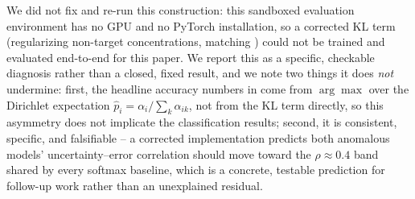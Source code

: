 We did not fix and re-run this construction: this sandboxed evaluation environment has no GPU and
no PyTorch installation, so a corrected KL term (regularizing non-target concentrations, matching
\citet{sensoy2018evidential}) could not be trained and evaluated end-to-end for this paper. We
report this as a specific, checkable diagnosis rather than a closed, fixed result, and we note two
things it does \emph{not} undermine: first, the headline accuracy numbers in
 come from $\arg\max$ over the Dirichlet expectation $\hat p_i=\alpha_i/\sum_k
\alpha_{ik}$, not from the KL term directly, so this asymmetry does not implicate the classification
results; second, it is consistent, specific, and falsifiable -- a corrected implementation predicts
both anomalous models' uncertainty--error correlation should move toward the $\rho\approx0.4$ band
shared by every softmax baseline, which is a concrete, testable prediction for follow-up work rather
than an unexplained residual.
